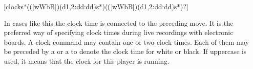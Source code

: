\documentclass[letterpaper,10pt,english]{sphinxmanual}
\begin{document}
\begin{sphinxVerbatim}[commandchars=\\\{\}]
\PYGZbs{}[\PYGZpc{}clock\PYGZbs{}s*(([wWbB])(\PYGZbs{}d\PYGZob{}1,2\PYGZcb{}:\PYGZbs{}d\PYGZbs{}d:\PYGZbs{}d\PYGZbs{}d)\PYGZbs{}s*)(([wWbB])(\PYGZbs{}d\PYGZob{}1,2\PYGZcb{}:\PYGZbs{}d\PYGZbs{}d:\PYGZbs{}d\PYGZbs{}d)\PYGZbs{}s*)?\PYGZbs{}]
\end{sphinxVerbatim}

\sphinxAtStartPar
{}

\begin{sphinxVerbatim}[commandchars=\\\{\}]
  \PYG{p}{[}  \PYG{p}{]}

 \PYG{p}{[} \PYG{p}{]}    
\PYG{p}{[} \PYG{p}{]}   
\end{sphinxVerbatim}

\sphinxAtStartPar
In cases like this the clock time is connected to the preceding move. It is
the preferred way of specifying clock times during live recordings with
electronic boards. A clock command may contain one or two clock times. Each
of them may be preceded by a  or a  to denote the clock time for
white or black. If uppercase is used, it means that the clock for this player
is running.
\end{document}
